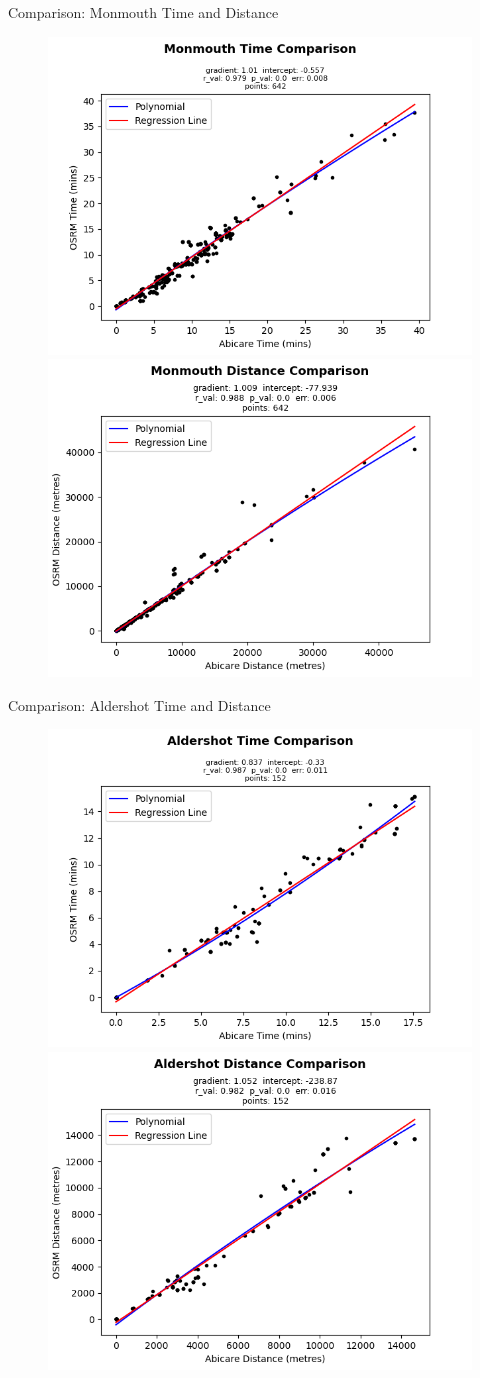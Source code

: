 \documentclass[usenames,dvipsnames]{beamer}
\begin{document}
\begin{frame}{Comparison: Monmouth Time and Distance}
	\begin{figure}
		\includegraphics[width=0.5\linewidth]{figures/Monmouth_time_comparison_abi}%
		\includegraphics[width=0.5\linewidth]{figures/Monmouth_dist_comparison_abi}
	\end{figure}
\end{frame}

\begin{frame}{Comparison: Aldershot Time and Distance}
	\begin{figure}
		\includegraphics[width=0.5\linewidth]{figures/Aldershot_time_comparison_abi}%
		\includegraphics[width=0.5\linewidth]{figures/Aldershot_dist_comparison_abi}
	\end{figure}
\end{frame}
\end{document}
